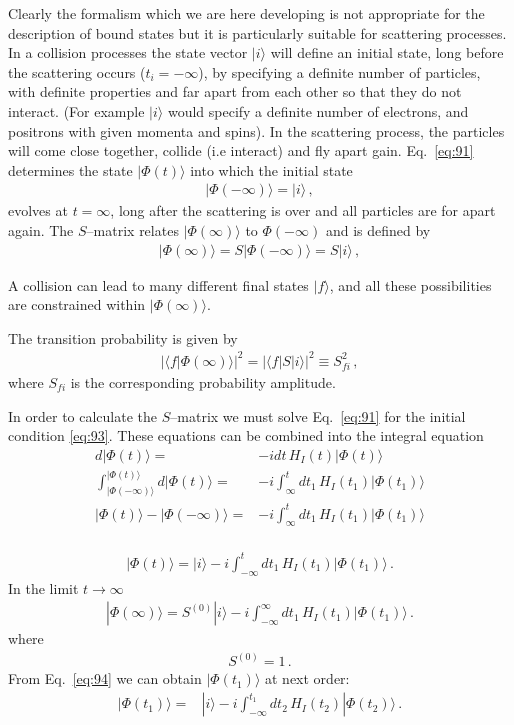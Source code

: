 Clearly the formalism which we are here developing is not appropriate for the description of bound states but it is particularly suitable for scattering processes. In a collision processes the state vector $|i\rangle$ will define an initial state, long before the scattering occurs ($t_i=-\infty$), by specifying a definite number of particles, with definite properties and far apart from each other so that they do not interact. (For example $|i\rangle$ would specify a definite number of electrons, and positrons with given momenta and spins). In the scattering process, the particles will come close together, collide (i.e interact) and fly apart gain. Eq.~\eqref{eq:91} determines the state $|\Phi(t)\rangle$ into which the initial state
\begin{align}
  |\Phi(-\infty)\rangle=|i\rangle\,,
\end{align}
evolves at $t=\infty$, long after the scattering is over and all particles are for apart again. The $S$--matrix relates $|\Phi(\infty)\rangle$ to $\Phi(-\infty)$ and is defined by
\begin{align}
  |\Phi(\infty)\rangle=S|\Phi(-\infty)\rangle=S|i\rangle\,,
\end{align}

A collision can lead to many different final states $|f\rangle$, and all these possibilities are constrained within $|\Phi(\infty)\rangle$.

The transition probability is given by
\begin{align}
  \left|\langle f|\Phi(\infty)\rangle\right|^2=  \left|\langle f|S|i\rangle\right|^2\equiv S_{f i}^2\,,
\end{align}
where $S_{f i}$ is the corresponding probability amplitude.

In order to calculate the $S$--matrix we must solve Eq.~\eqref{eq:91} for the initial condition \eqref{eq:93}. These equations can be combined into the integral equation
\begin{align}
 d |\Phi(t)\rangle=&-i d t\,H_I(t)|\Phi(t)\rangle\nonumber\\
\int_{|\Phi(-\infty)\rangle}^{|\Phi(t)\rangle} d |\Phi(t)\rangle=&-i \int_\infty^t d t_1\,H_I(t_1)|\Phi(t_1)\rangle\nonumber\\
|\Phi(t)\rangle-|\Phi(-\infty)\rangle=&-i \int_\infty^t d t_1\,H_I(t_1)|\Phi(t_1)\rangle\nonumber\\
\end{align}

\begin{align}
\label{eq:94}
  |\Phi(t)\rangle=|i\rangle-i\int_{-\infty}^t d t_1\,H_I(t_1)|\Phi(t_1)\rangle\,.
\end{align}
In the limit $t\to\infty$
\begin{align}
  |\Phi(\infty)\rangle=S^{(0)}|i\rangle-i\int_{-\infty}^\infty d t_1\,H_I(t_1)|\Phi(t_1)\rangle\,.
\end{align}
where 
\begin{align}
  S^{(0)}=1\,.
\end{align}
From Eq.~\eqref{eq:94} we can obtain $|\Phi(t_1)\rangle$ at next order:
\begin{align}
  |\Phi(t_1)\rangle=&|i\rangle-i\int_{-\infty}^{t_1} d t_2\,H_I(t_2)|\Phi(t_2)\rangle\,.
\end{align}


